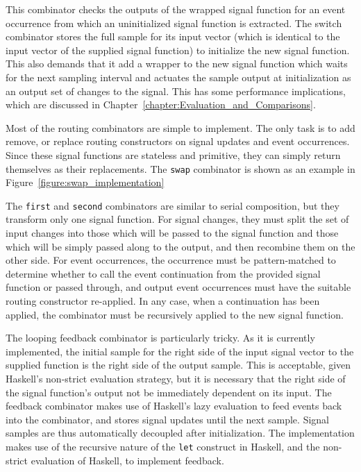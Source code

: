 This combinator checks the outputs of the wrapped
signal function for an event occurrence from which an uninitialized signal
function is extracted. The switch combinator stores the full sample
for its input vector (which is identical to the input vector of the supplied
signal function) to initialize the new signal function. This also demands that
it add a wrapper to the new signal function which waits for the next sampling
interval and actuates the sample output at initialization as an output set
of changes to the signal. This has some performance implications, which are
discussed in Chapter~\ref{chapter:Evaluation_and_Comparisons}.

Most of the routing combinators are simple to implement. The only task is to add
remove, or replace routing constructors on signal updates and event occurrences.
Since these signal functions are stateless and primitive, they can simply
return themselves as their replacements. The {\tt swap} combinator is shown as
an example in Figure~\ref{figure:swap_implementation}

The {\tt first} and {\tt second} combinators are similar to serial composition,
but they transform only one signal function. For signal changes, they must split
the set of input changes into those which will be passed to the signal function
and those which will be simply passed along to the output, and then recombine
them on the other side. For event occurrences, the occurrence must be
pattern-matched to determine whether to call the event continuation from the
provided signal function or passed through, and output event occurrences must
have the suitable routing constructor re-applied. In any case, when a
continuation has been applied, the combinator must be recursively applied to the
new signal function.

The looping feedback combinator is particularly tricky. As it is currently
implemented, the initial sample for the right side of the input signal vector to
the supplied function is the right side of the output sample. This is acceptable,
given Haskell's non-strict evaluation strategy, but it is necessary that the
right side of the signal function's output not be immediately dependent on its
input. The feedback combinator makes use of Haskell's lazy evaluation to
feed events back into the combinator, and stores signal updates until the next
sample. Signal samples are thus automatically decoupled after initialization.
The implementation makes use of the recursive nature of the {\tt let} construct
in Haskell, and the non-strict evaluation of Haskell, to implement feedback.


